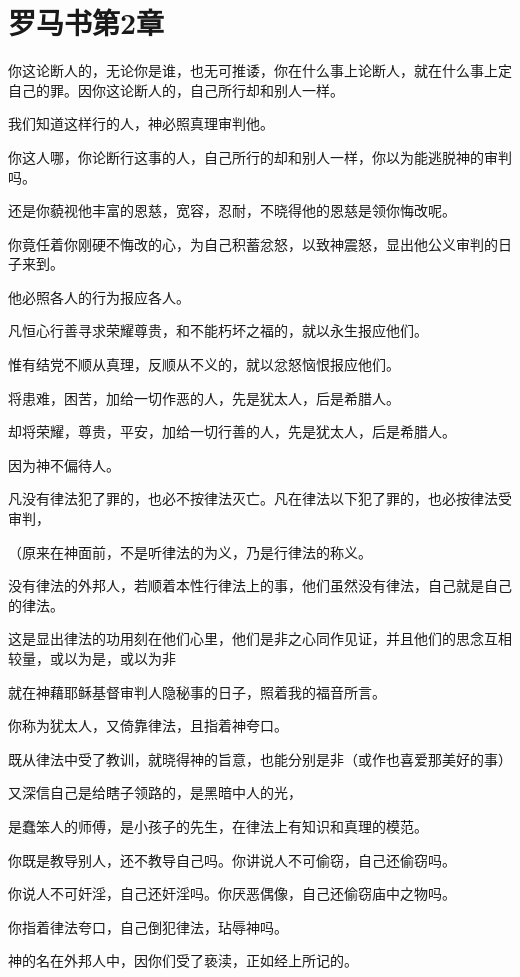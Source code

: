 \documentclass[12pt,oneside]{book}
\begin{document}
\chapter{罗马书第2章}
你这论断人的，无论你是谁，也无可推诿，你在什么事上论断人，就在什么事上定自己的罪。因你这论断人的，自己所行却和别人一样。

我们知道这样行的人，神必照真理审判他。

你这人哪，你论断行这事的人，自己所行的却和别人一样，你以为能逃脱神的审判吗。

还是你藐视他丰富的恩慈，宽容，忍耐，不晓得他的恩慈是领你悔改呢。

你竟任着你刚硬不悔改的心，为自己积蓄忿怒，以致神震怒，显出他公义审判的日子来到。

他必照各人的行为报应各人。

凡恒心行善寻求荣耀尊贵，和不能朽坏之福的，就以永生报应他们。

惟有结党不顺从真理，反顺从不义的，就以忿怒恼恨报应他们。

将患难，困苦，加给一切作恶的人，先是犹太人，后是希腊人。

却将荣耀，尊贵，平安，加给一切行善的人，先是犹太人，后是希腊人。

因为神不偏待人。

凡没有律法犯了罪的，也必不按律法灭亡。凡在律法以下犯了罪的，也必按律法受审判，

（原来在神面前，不是听律法的为义，乃是行律法的称义。

没有律法的外邦人，若顺着本性行律法上的事，他们虽然没有律法，自己就是自己的律法。

这是显出律法的功用刻在他们心里，他们是非之心同作见证，并且他们的思念互相较量，或以为是，或以为非

就在神藉耶稣基督审判人隐秘事的日子，照着我的福音所言。

你称为犹太人，又倚靠律法，且指着神夸口。

既从律法中受了教训，就晓得神的旨意，也能分别是非（或作也喜爱那美好的事）

又深信自己是给瞎子领路的，是黑暗中人的光，

是蠢笨人的师傅，是小孩子的先生，在律法上有知识和真理的模范。

你既是教导别人，还不教导自己吗。你讲说人不可偷窃，自己还偷窃吗。

你说人不可奸淫，自己还奸淫吗。你厌恶偶像，自己还偷窃庙中之物吗。

你指着律法夸口，自己倒犯律法，玷辱神吗。

神的名在外邦人中，因你们受了亵渎，正如经上所记的。
\end{document}
